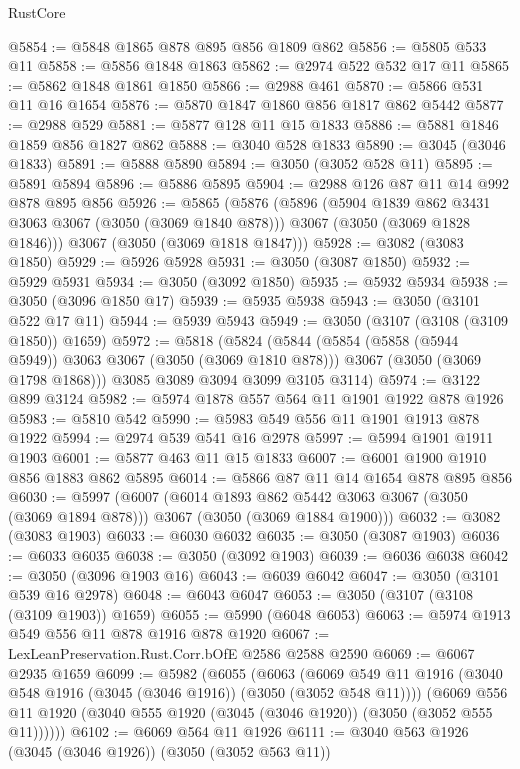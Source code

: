 \begin{lexlean}{RustCore}
\begin{coremodule}
@5854 := @5848 @1865 @878 @895 @856 @1809 @862
@5856 := @5805 @533 @11
@5858 := @5856 @1848 @1863
@5862 := @2974 @522 @532 @17 @11
@5865 := @5862 @1848 @1861 @1850
@5866 := @2988 @461
@5870 := @5866 @531 @11 @16 @1654
@5876 := @5870 @1847 @1860 @856 @1817 @862 @5442
@5877 := @2988 @529
@5881 := @5877 @128 @11 @15 @1833
@5886 := @5881 @1846 @1859 @856 @1827 @862
@5888 := @3040 @528 @1833
@5890 := @3045 (@3046 @1833)
@5891 := @5888 @5890
@5894 := @3050 (@3052 @528 @11)
@5895 := @5891 @5894
@5896 := @5886 @5895
@5904 := @2988 @126 @87 @11 @14 @992 @878 @895 @856
@5926 := @5865
    (@5876
      (@5896
        (@5904 @1839 @862 @3431 @3063 @3067 (@3050 (@3069 @1840 @878)))
        @3067
        (@3050 (@3069 @1828 @1846)))
      @3067
      (@3050 (@3069 @1818 @1847)))
@5928 := @3082 (@3083 @1850)
@5929 := @5926 @5928
@5931 := @3050 (@3087 @1850)
@5932 := @5929 @5931
@5934 := @3050 (@3092 @1850)
@5935 := @5932 @5934
@5938 := @3050 (@3096 @1850 @17)
@5939 := @5935 @5938
@5943 := @3050 (@3101 @522 @17 @11)
@5944 := @5939 @5943
@5949 := @3050 (@3107 (@3108 (@3109 @1850)) @1659)
@5972 := @5818
    (@5824
      (@5844
        (@5854 (@5858 (@5944 @5949)) @3063 @3067 (@3050 (@3069 @1810 @878)))
        @3067
        (@3050 (@3069 @1798 @1868)))
      @3085
      @3089
      @3094
      @3099
      @3105
      @3114)
@5974 := @3122 @899 @3124
@5982 := @5974 @1878 @557 @564 @11 @1901 @1922 @878 @1926
@5983 := @5810 @542
@5990 := @5983 @549 @556 @11 @1901 @1913 @878 @1922
@5994 := @2974 @539 @541 @16 @2978
@5997 := @5994 @1901 @1911 @1903
@6001 := @5877 @463 @11 @15 @1833
@6007 := @6001 @1900 @1910 @856 @1883 @862 @5895
@6014 := @5866 @87 @11 @14 @1654 @878 @895 @856
@6030 := @5997
    (@6007
      (@6014 @1893 @862 @5442 @3063 @3067 (@3050 (@3069 @1894 @878)))
      @3067
      (@3050 (@3069 @1884 @1900)))
@6032 := @3082 (@3083 @1903)
@6033 := @6030 @6032
@6035 := @3050 (@3087 @1903)
@6036 := @6033 @6035
@6038 := @3050 (@3092 @1903)
@6039 := @6036 @6038
@6042 := @3050 (@3096 @1903 @16)
@6043 := @6039 @6042
@6047 := @3050 (@3101 @539 @16 @2978)
@6048 := @6043 @6047
@6053 := @3050 (@3107 (@3108 (@3109 @1903)) @1659)
@6055 := @5990 (@6048 @6053)
@6063 := @5974 @1913 @549 @556 @11 @878 @1916 @878 @1920
@6067 := LexLeanPreservation.Rust.Corr.bOfE @2586 @2588 @2590
@6069 := @6067 @2935 @1659
@6099 := @5982
    (@6055
      (@6063
        (@6069 @549 @11 @1916 (@3040 @548 @1916 (@3045 (@3046 @1916)) (@3050 (@3052 @548 @11))))
        (@6069 @556 @11 @1920 (@3040 @555 @1920 (@3045 (@3046 @1920)) (@3050 (@3052 @555 @11))))))
@6102 := @6069 @564 @11 @1926
@6111 := @3040 @563 @1926 (@3045 (@3046 @1926)) (@3050 (@3052 @563 @11))

\end{coremodule}
\end{lexlean}
